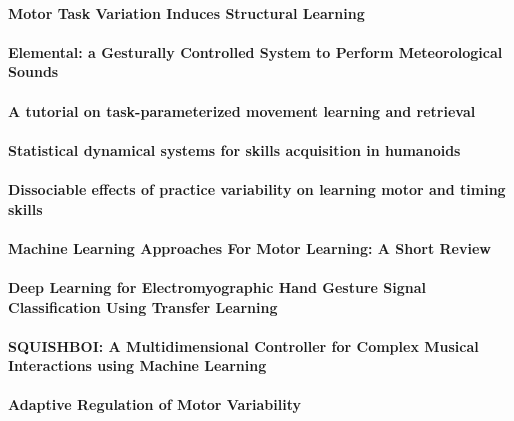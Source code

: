\documentclass[11pt]{article}
\begin{document}
\paragraph{Motor Task Variation Induces Structural Learning} \citep{braun_motor_2009}


\paragraph{Elemental: a Gesturally Controlled System to Perform Meteorological Sounds} \citep{brizolara_elemental_2020}


\paragraph{A tutorial on task-parameterized movement learning and retrieval} \citep{calinon_tutorial_2016}


\paragraph{Statistical dynamical systems for skills acquisition in humanoids} \citep{calinon_statistical_2012}


\paragraph{Dissociable effects of practice variability on learning motor and timing skills} \citep{caramiaux_dissociable_2018}


\paragraph{Machine Learning Approaches For Motor Learning: A Short Review} \citep{caramiaux_machine_2020}


\paragraph{Deep Learning for Electromyographic Hand Gesture Signal Classification Using Transfer Learning} \citep{cote-allard_deep_2019}


\paragraph{SQUISHBOI: A Multidimensional Controller for Complex Musical Interactions using Machine Learning} \citep{desmith_squishboi_2020}


\paragraph{Adaptive Regulation of Motor Variability} \citep{dhawale_adaptive_2019}
\end{document}
